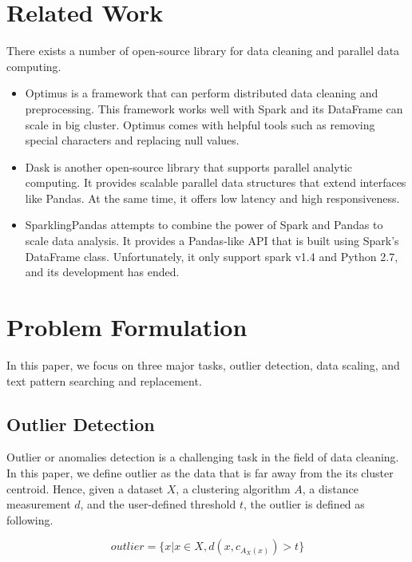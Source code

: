 \documentclass[sigconf]{acmart}
\begin{document}
\section{Related Work}
There exists a number of open-source library for data cleaning and parallel data computing. 
\begin{itemize}
	\item{Optimus}\cite{optimus} is a framework that can perform distributed data cleaning and preprocessing. This framework works well with Spark and its DataFrame can scale in big cluster. Optimus comes with helpful tools such as removing special characters and replacing null values.
	\item{Dask}\cite{dask} is another open-source library that supports parallel analytic computing. It provides scalable parallel data structures that extend interfaces like Pandas. At the same time, it offers low latency and high responsiveness.
	\item{SparklingPandas}\cite{sparklingpandas} attempts to combine the power of Spark and Pandas to scale data analysis. It provides a Pandas-like API that is built using Spark's DataFrame class. Unfortunately, it only support spark v1.4 and Python 2.7, and its development has ended.
\end{itemize}

\section{Problem Formulation}
In this paper, we focus on three major tasks, outlier detection, data scaling, and text pattern searching and replacement.
\subsection{Outlier Detection}
Outlier or anomalies detection is a challenging task in the field of data cleaning\cite{anomal}. In this paper, we define outlier as the data that is far away from the its cluster centroid. Hence, given a dataset $X$, a clustering algorithm $A$\cite{MMD}, a distance measurement $d$, and the user-defined threshold $t$, the outlier is defined as following.

\[ outlier = \{x | x \in X, d( x, c_{A_X(x)} ) > t \}  \]
\end{document}
